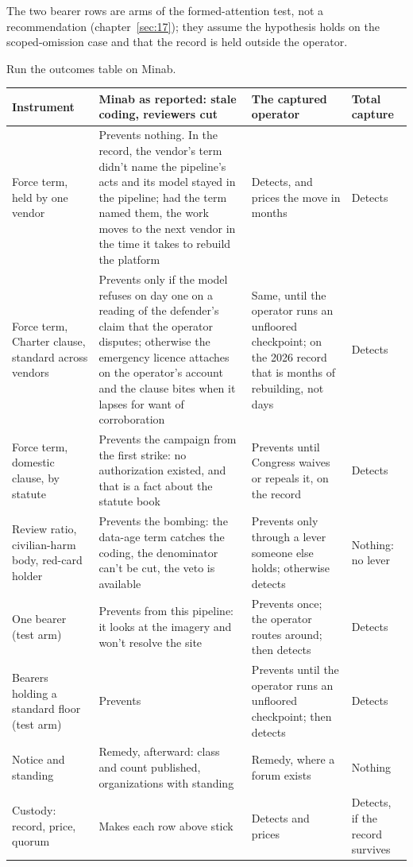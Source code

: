 The two bearer rows are arms of the formed-attention test, not a recommendation (chapter~\ref{sec:17}); they assume the hypothesis holds on the scoped-omission case and that the record is held outside the operator.

Run the outcomes table on Minab.

\begingroup\small\renewcommand{\arraystretch}{1.12}
\begin{longtable}{@{}>{\raggedright\arraybackslash}p{}>{\raggedright\arraybackslash}p{}>{\raggedright\arraybackslash}p{}>{\raggedright\arraybackslash}p{}@{}}
\hline
\textbf{Instrument} & \textbf{Minab as reported: stale coding, reviewers cut} & \textbf{The captured operator} & \textbf{Total capture} \\
\hline
\endhead
Force term, held by one vendor & Prevents nothing. In the record, the vendor's term didn't name the pipeline's acts and its model stayed in the pipeline; had the term named them, the work moves to the next vendor in the time it takes to rebuild the platform & Detects, and prices the move in months & Detects \\ \hline
Force term, Charter clause, standard across vendors & Prevents only if the model refuses on day one on a reading of the defender's claim that the operator disputes; otherwise the emergency licence attaches on the operator's account and the clause bites when it lapses for want of corroboration & Same, until the operator runs an unfloored checkpoint; on the 2026 record that is months of rebuilding, not days & Detects \\ \hline
Force term, domestic clause, by statute & Prevents the campaign from the first strike: no authorization existed, and that is a fact about the statute book & Prevents until Congress waives or repeals it, on the record & Detects \\ \hline
Review ratio, civilian-harm body, red-card holder & Prevents the bombing: the data-age term catches the coding, the denominator can't be cut, the veto is available & Prevents only through a lever someone else holds; otherwise detects & Nothing: no lever \\ \hline
One bearer (test arm) & Prevents from this pipeline: it looks at the imagery and won't resolve the site & Prevents once; the operator routes around; then detects & Detects \\ \hline
Bearers holding a standard floor (test arm) & Prevents & Prevents until the operator runs an unfloored checkpoint; then detects & Detects \\ \hline
Notice and standing & Remedy, afterward: class and count published, organizations with standing & Remedy, where a forum exists & Nothing \\ \hline
Custody: record, price, quorum & Makes each row above stick & Detects and prices & Detects, if the record survives \\ \hline
\end{longtable}
\endgroup

